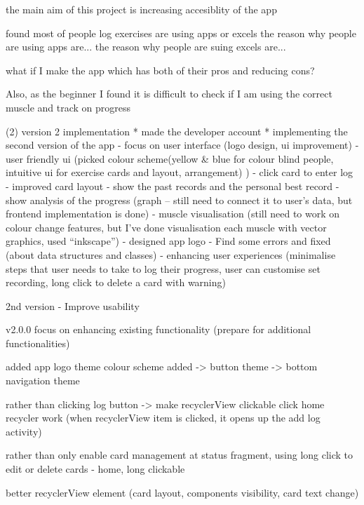 the main aim of this project is increasing accesiblity of the app

found most of people log exercises are using apps or excels
the reason why people are using apps are...
the reason why people are suing excels are...

what if I make the app which has both of their pros and reducing cons?

Also, as the beginner I found it is difficult to check if I am using the correct muscle and track on progress


(2) version 2 implementation
* made the developer account
* implementing the second version of the app
    - focus on user interface (logo design, ui improvement)
    -user friendly ui (picked colour scheme(yellow & blue for colour blind people, intuitive ui for exercise cards and layout, arrangement) )
    - click card to enter log
    - improved card layout
    - show the past records and the personal best record
    - show analysis of the progress (graph – still need to connect it to user’s data, but frontend implementation is done)
    - muscle visualisation (still need to work on colour change features, but I’ve done visualisation each muscle with vector graphics, used “inkscape”)
    - designed app logo
    - Find some errors and fixed (about data structures and classes)
    - enhancing user experiences
(minimalise steps that user needs to take to log their progress, user can customise set recording, long click to delete a card with warning)


2nd version - Improve usability


\version v2.0.0 {
    focus on enhancing existing functionality
    (prepare for additional functionalities)
}


added app logo
theme {
    colour scheme added
    -> button theme 
    -> bottom navigation theme 
}


rather than clicking log button -> make recyclerView clickable
    click home recycler work (when recyclerView item is clicked, it opens up the add log activity)

rather than only enable card management at status fragment, using long click to edit or delete cards - home, long clickable
 
better recyclerView element (card layout, components visibility, card text change)

